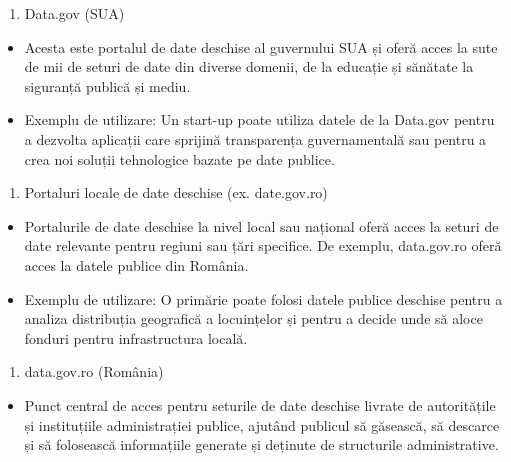 \documentclass[
  11pt,
  b5paper,
  nottoc]{book}
\providecommand{\tightlist}{%
  \setlength{\itemsep}{0pt}\setlength{\parskip}{0pt}}\usepackage{longtable,booktabs,array}
\begin{document}
\begin{enumerate}
\def\labelenumi{\arabic{enumi}.}
\setcounter{enumi}{1}
\tightlist
\item
  Data.gov (SUA)
\end{enumerate}

\begin{itemize}
\tightlist
\item
  Acesta este portalul de date deschise al guvernului SUA și oferă acces
  la sute de mii de seturi de date din diverse domenii, de la educație
  și sănătate la siguranță publică și mediu.\\
\item
  Exemplu de utilizare: Un start-up poate utiliza datele de la Data.gov
  pentru a dezvolta aplicații care sprijină transparența guvernamentală
  sau pentru a crea noi soluții tehnologice bazate pe date publice.
\end{itemize}

\begin{enumerate}
\def\labelenumi{\arabic{enumi}.}
\setcounter{enumi}{2}
\tightlist
\item
  Portaluri locale de date deschise (ex. date.gov.ro)
\end{enumerate}

\begin{itemize}
\tightlist
\item
  Portalurile de date deschise la nivel local sau național oferă acces
  la seturi de date relevante pentru regiuni sau țări specifice. De
  exemplu, data.gov.ro oferă acces la datele publice din România.\\
\item
  Exemplu de utilizare: O primărie poate folosi datele publice deschise
  pentru a analiza distribuția geografică a locuințelor și pentru a
  decide unde să aloce fonduri pentru infrastructura locală.
\end{itemize}

\begin{enumerate}
\def\labelenumi{\arabic{enumi}.}
\setcounter{enumi}{3}
\tightlist
\item
  data.gov.ro (România)
\end{enumerate}

\begin{itemize}
\tightlist
\item
  Punct central de acces pentru seturile de date deschise livrate de
  autoritățile și instituțiile administrației publice, ajutând publicul
  să găsească, să descarce și să folosească informațiile generate și
  deținute de structurile administrative.
\end{itemize}
\end{document}
